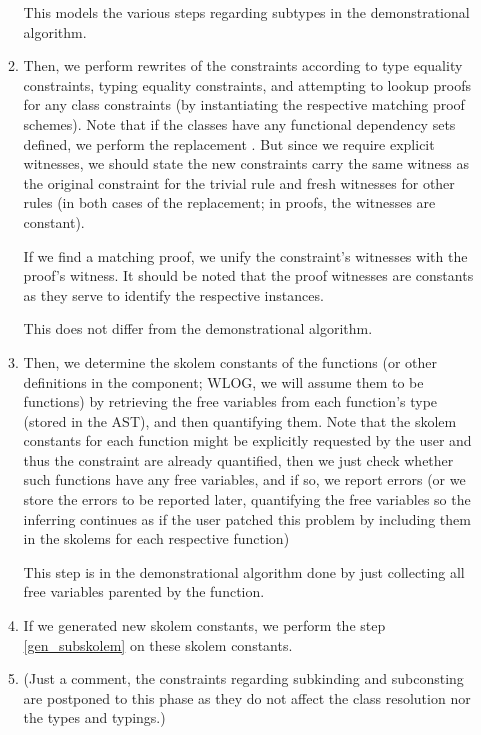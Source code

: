 \begin{enumerate}
\begin{enumerate}
        This models the various steps regarding subtypes in the demonstrational algorithm.

        \item Then, we perform rewrites of the constraints according to type equality constraints, typing equality constraints, and attempting to lookup proofs for any class constraints (by instantiating the respective matching proof schemes). Note that if the classes have any functional dependency sets defined, we perform the replacement  . But since we require explicit witnesses, we should state the new constraints carry the same witness as the original constraint for the trivial rule and fresh witnesses for other rules (in both cases of the replacement; in proofs, the witnesses are constant).

        If we find a matching proof, we unify the constraint's witnesses with the proof's witness. It should be noted that the proof witnesses are constants as they serve to identify the respective instances.

        This does not differ from the demonstrational algorithm.

        \item Then, we determine the skolem constants of the functions (or other definitions in the component; WLOG, we will assume them to be functions) by retrieving the free variables from each function's type (stored in the AST), and then quantifying them. Note that the skolem constants for each function might be explicitly requested by the user and thus the constraint are already quantified, then we just check whether such functions have any free variables, and if so, we report errors (or we store the errors to be reported later, quantifying the free variables so the inferring continues as if the user patched this problem by including them in the skolems for each  respective function) \label{func_skolem}

        This step is in the demonstrational algorithm done by just collecting all free variables parented by the function.

        \item If we generated new skolem constants, we perform the step \ref{gen_subskolem} on these skolem constants.


        \item (Just a comment, the constraints regarding subkinding and subconsting are postponed to this phase as they do not affect the class resolution nor the types and typings.)


\end{enumerate}
\end{enumerate}
